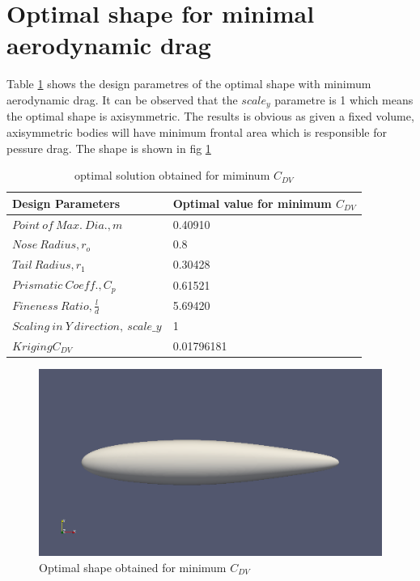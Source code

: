 \section{Optimal shape for minimal aerodynamic drag}

Table \ref{optimal solution obtained} shows the design parametres of the optimal shape with minimum aerodynamic drag. It can be observed that the $ scale_y $ parametre is 1 which means the optimal shape is axisymmetric. The results is obvious as given a fixed volume, axisymmetric bodies will have minimum frontal area which is responsible for pessure drag. The shape is shown in fig \ref{Optimal min cdv}

\begin{table}[H]
	\centering
	\caption{optimal solution obtained for miminum $ C_{DV} $}
	\label{optimal solution obtained}
	\begin{tabular}{ll}
		\hline \hline
		Design Parameters & Optimal value for minimum $ C_{DV} $    \\ \hline \hline
		
		$ Point\ of\ Max.\ Dia., m$ & 0.40910      \\  
		$ Nose\ Radius, r _{o} $ & 0.8    \\
		$ Tail\ Radius, r _{1} $ & 0.30428     \\  
		$ Prismatic\ Coeff., C _{p }$ & 0.61521 \\
		$ Fineness\ Ratio, \frac{l}{d} $ &5.69420 \\
		$Scaling\ in\ Y\ direction,\ scale\_y$ & 1 \\ \hline \hline
		
		$ Kriging C_{DV} $ & 0.01796181 \\
		\hline \hline
	\end{tabular}
\end{table}

\begin{figure}[H]
	\centering
	\includegraphics[width=300 pt]{surrogate_model_CFD_results/low_drag_body.png}
	\caption{Optimal shape obtained for minimum $ C_{DV} $}
	\label{Optimal min cdv} %
\end{figure}


